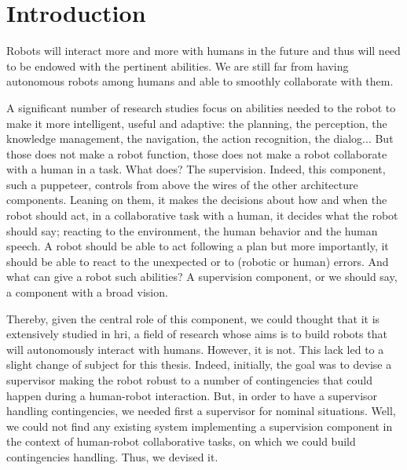 \documentclass[a4paper,11pt,twoside]{StyleThese}
\begin{document}
\fi


\chapter*{Introduction}

Robots will interact more and more with humans in the future and thus will need to be endowed with the pertinent abilities. We are still far from having autonomous robots among humans and able to smoothly collaborate with them.

A significant number of research studies focus on abilities needed to the robot to make it more intelligent, useful and adaptive: the planning, the perception, the knowledge management, the navigation, the action recognition, the dialog... But those does not make a robot function, those does not make a robot collaborate with a human in a task. What does? The supervision. Indeed, this component, such a puppeteer, controls from above the wires of the other architecture components. Leaning on them, it makes the decisions about how and when the robot should act, in a collaborative task with a human, it decides what the robot should say; reacting to the environment, the human behavior and the human speech. A robot should be able to act following a plan but more importantly, it should be able to react to the unexpected or to (robotic or human) errors. And what can give a robot such abilities? A supervision component, or we should say, a component with a broad vision.

Thereby, given the central role of this component, we could thought that it is extensively studied in \acrlong{hri}, a field of research whose aims is to build robots that will autonomously interact with humans. However, it is not. This lack led to a slight change of subject for this thesis. Indeed, initially, the goal was to devise a supervisor making the robot robust to a number of contingencies that could happen during a human-robot interaction. But, in order to have a supervisor handling contingencies, we needed first a supervisor for nominal situations. Well, we could not find any existing system implementing a supervision component in the context of human-robot collaborative tasks, on which we could build contingencies handling. Thus, we devised it.
\end{document}
